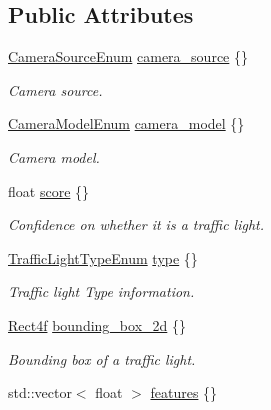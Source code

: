 \subsection*{Public Attributes}
\begin{DoxyCompactItemize}
\item 
\hyperlink{structmaf__perception__interface_1_1CameraSourceEnum}{Camera\+Source\+Enum} \hyperlink{structmaf__perception__interface_1_1TrafficLightSingleFrame_a50ccbb5ebd74dc5a271732de68671d3e}{camera\+\_\+source} \{\}
\begin{DoxyCompactList}\small\item\em Camera source. \end{DoxyCompactList}\item 
\hyperlink{structmaf__perception__interface_1_1CameraModelEnum}{Camera\+Model\+Enum} \hyperlink{structmaf__perception__interface_1_1TrafficLightSingleFrame_afd1319a3269adc504652720310fc1485}{camera\+\_\+model} \{\}
\begin{DoxyCompactList}\small\item\em Camera model. \end{DoxyCompactList}\item 
float \hyperlink{structmaf__perception__interface_1_1TrafficLightSingleFrame_aede9847d966650193ab9161be7e809d4}{score} \{\}
\begin{DoxyCompactList}\small\item\em Confidence on whether it is a traffic light. \end{DoxyCompactList}\item 
\hyperlink{structmaf__perception__interface_1_1TrafficLightTypeEnum}{Traffic\+Light\+Type\+Enum} \hyperlink{structmaf__perception__interface_1_1TrafficLightSingleFrame_a91a3d4a46db95bade03917f2122ef279}{type} \{\}
\begin{DoxyCompactList}\small\item\em Traffic light Type information. \end{DoxyCompactList}\item 
\hyperlink{structmaf__perception__interface_1_1Rect4f}{Rect4f} \hyperlink{structmaf__perception__interface_1_1TrafficLightSingleFrame_af838aebf1e723282bdd128c0a461eb3a}{bounding\+\_\+box\+\_\+2d} \{\}
\begin{DoxyCompactList}\small\item\em Bounding box of a traffic light. \end{DoxyCompactList}\item 
std\+::vector$<$ float $>$ \hyperlink{structmaf__perception__interface_1_1TrafficLightSingleFrame_a5abb923ce2e823d869cd1d67bea534bc}{features} \{\}

\end{DoxyCompactItemize}
